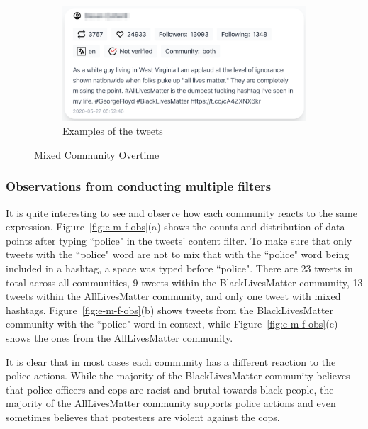 \begin{figure}[H]
\begin{subfigure}{.5\textwidth}
  
  \includegraphics[width=1\linewidth]{Report-latex/tex_files/pics/example/obserm2.png}
  \caption{Examples of the tweets}
  \label{fig:sub-second}
\end{subfigure}

\captionsetup{justification=centering}
\caption{Mixed Community Overtime}
\label{fig:e-mixed-overtime}
\end{figure}


\subsubsection{Observations from conducting multiple filters}

It is quite interesting to see and observe how each community reacts to the same expression. Figure~\ref{fig:e-m-f-obs}(a) shows the counts and distribution of data points after typing ``police" in the tweets' content filter. To make sure that only tweets with the ``police" word are not to mix that with the ``police" word being included in a hashtag, a space was typed before ``police". There are 23 tweets in total across all communities, 9 tweets within the BlackLivesMatter community, 13 tweets within the AllLivesMatter community, and only one tweet with mixed hashtags. Figure~\ref{fig:e-m-f-obs}(b) shows tweets from 
the BlackLivesMatter community with the ``police" word in context, while Figure~\ref{fig:e-m-f-obs}(c) shows the ones from the AllLivesMatter community. 


It is clear that in most cases each community has a different reaction to the police actions. While the majority of the BlackLivesMatter community believes that police officers and cops are racist and brutal towards black people, the majority of the AllLivesMatter community supports police actions and even sometimes believes that protesters are violent against the cops.   


